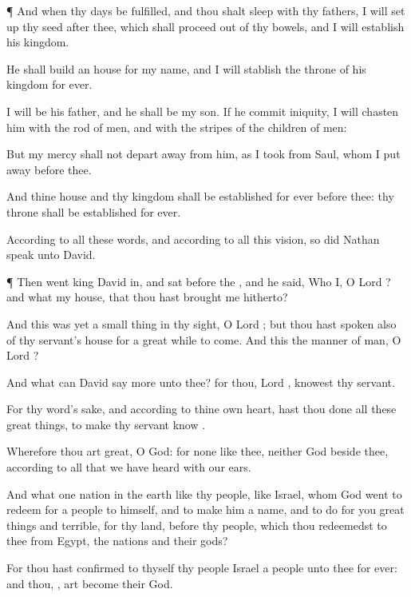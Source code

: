 {\par }{\PP {}¶ And when thy
days be
fulfilled, and thou shalt
sleep with thy
fathers, I will set
up thy
seed
after thee, which shall
proceed out of thy
bowels, and I will
establish his
kingdom.

He shall
build an
house for my
name, and I will
stablish the
throne of his
kingdom
for
ever.

I will be his
father, and he shall be my
son. If he commit
iniquity, I will
chasten him with the
rod of
men, and with the
stripes of the
children of
men:

But my
mercy shall not depart
away from him, as I
took
{} from
Saul, whom I put
away
before thee.

And thine
house and thy
kingdom shall be
established
for
ever
before thee: thy
throne shall be
established
for
ever.

According to all these
words, and according to all this
vision, so did
Nathan
speak unto
David.


\par }{\PP {}¶ Then
went
king
David in, and
sat
before the
{}, and he
said, Who
{} I, O
Lord
{}? and what
{} my
house, that thou hast
brought me
hitherto?

And this was yet a small
thing in thy
sight, O
Lord
{}; but thou hast
spoken also of thy
servant’s
house for a great while to
come. And
{} this the
manner of
man, O
Lord
{}?

And what
can
David
say
more unto thee? for thou,
Lord
{},
knowest thy
servant.

For thy
word’s sake, and according to thine own
heart, hast thou
done all these great
things, to make thy
servant
know
{}.

Wherefore thou art
great, O
{}
God: for
{} none like thee, neither
{}
God
beside thee, according to all that we have
heard with our
ears.

And what
one
nation in the
earth
{} like thy
people,
{} like
Israel, whom
God
went to
redeem for a
people to himself, and to
make him a
name, and to
do for you great
things and
terrible, for thy
land,
before thy
people, which thou
redeemedst to thee from
Egypt,
{} the
nations and their
gods?

For thou hast
confirmed to thyself thy
people
Israel
{} a
people unto thee
for
ever: and thou,
{}, art
become their
God.

}
